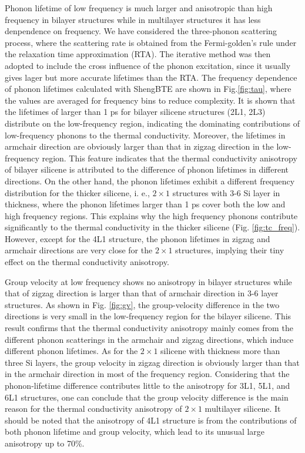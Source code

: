 \documentclass[aps,prb,twocolumn,showpacs,amsmath,amssymb]{revtex4-1}
\begin{document}
Phonon lifetime of low frequency is much larger and anisotropic than high frequency in bilayer structures while in multilayer structures it has less denpendence on frequency. We have considered the three-phonon scattering process, where the scattering rate is obtained from the Fermi-golden's rule\cite{Li2014} under the relaxation time approximation (RTA). The iterative method was then adopted to include the cross influence of the phonon excitation, since it usually gives lager but more accurate lifetimes than the RTA. The frequency dependence of phonon lifetimes calculated with ShengBTE\cite{Li2014} are shown in Fig.\ref{fig:tau}, where the values are averaged for frequency bins to reduce complexity.  It is shown that the lifetimes of larger than 1 ps for bilayer silicene structures (2L1, 2L3) distribute on the low-frequency region, indicating the dominating contributions of low-frequency phonons to the thermal conductivity. Moreover, the lifetimes in armchair direction are obviously larger than that in zigzag direction in the low-frequency region. This feature indicates that the thermal conductivity anisotropy of bilayer silicene is attributed to the difference of phonon lifetimes in different directions.
On the other hand, the phonon lifetimes exhibit a different frequency distribution for the thicker silicene, i. e.,  $2\times1$ structures with 3-6 Si layer in thickness, where the phonon lifetimes larger than 1 ps cover both the low and high frequency regions.  This explains why the high frequency phonons contribute significantly to the thermal conductivity in the thicker silicene (Fig. \ref{fig:tc_freq}).  However, except for the 4L1 structure, the phonon lifetimes in zigzag and armchair directions are very close for the $2\times1$ structures, implying their tiny effect on the thermal conductivity anisotropy.



Group velocity at low frequency shows no anisotropy in bilayer structures while that of zigzag direction is larger than that of armchair direction in 3-6 layer structures. As shown in Fig. \ref{fig:gv},  the group-velocity difference in the two directions is very small in the low-frequency region for the bilayer silicene. This result confirms that the thermal conductivity anisotropy mainly comes from the different phonon scatterings in the armchair and zigzag directions,  which induce different phonon lifetimes.
As for the $2\times 1$ silicene with thickness more than three Si layers,  the group velocity in zigzag direction is obviously larger than that in the armchair direction in most of the frequency region. Considering that the phonon-lifetime difference contributes little to the anisotropy for 3L1, 5L1, and 6L1 structures, one can conclude that the group velocity difference is the main reason for the thermal conductivity anisotropy of $2\times 1$ multilayer silicene. It should be noted that the anisotropy of 4L1 structure is from the contributions of both phonon lifetime and group velocity, which lead to its unusual large anisotropy up to 70\%.
\end{document}
